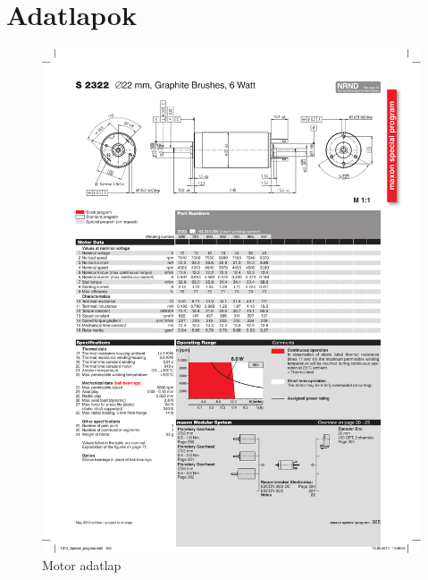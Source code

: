 \chapter{Adatlapok}
\begin{figure}[H]
    \begin{center}
    \includegraphics[width=\textwidth]{images/motor.pdf}
    \caption{Motor adatlap}\label{fig:motor_datasheet}
    \end{center}
\end{figure}

